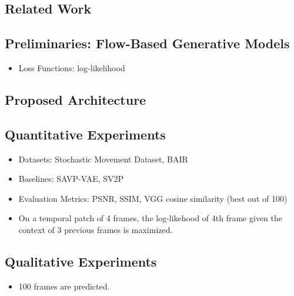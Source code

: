 \documentclass{article}
\begin{document}
    \subsection{Related Work}\label{subsec:VideoFlow_A_Flow_Based_Generative_Model_for_Video:related-work}

    \subsection{Preliminaries: Flow-Based Generative Models}\label{subsec:VideoFlow_A_Flow_Based_Generative_Model_for_Video:flow-based-gms}
    \begin{itemize}
        \item Loss Functions: log-likelihood
    \end{itemize}

    \subsection{Proposed Architecture}\label{subsec:VideoFlow_A_Flow_Based_Generative_Model_for_Video:proposed-architecture}

    \subsection{Quantitative Experiments}\label{subsec:VideoFlow_A_Flow_Based_Generative_Model_for_Video:quantitative-experiments}
    \begin{itemize}
        \item Datasets: Stochastic Movement Dataset, BAIR
        \item Baselines: SAVP-VAE, SV2P
        \item Evaluation Metrics: PSNR, SSIM, VGG cosine similarity (best out of 100)
        \item On a temporal patch of 4 frames, the log-likehood of 4th frame given the context of 3 previous frames is maximized.
    \end{itemize}

    \subsection{Qualitative Experiments}\label{subsec:VideoFlow_A_Flow_Based_Generative_Model_for_Video:qualitative-experiments}
    \begin{itemize}
        \item 100 frames are predicted.
    \end{itemize}
    \newpage
\end{document}
